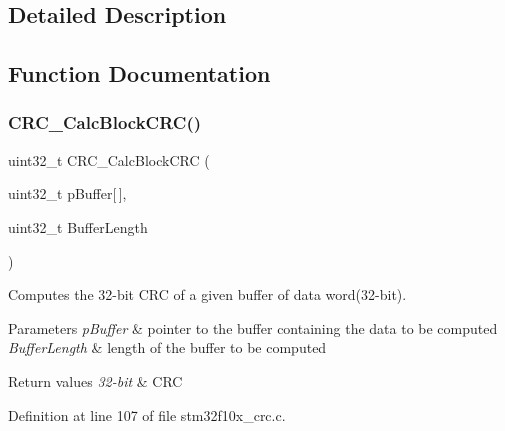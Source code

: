\subsection{Detailed Description}


\subsection{Function Documentation}
\mbox{\label{group___c_r_c___private___functions_gab15ebf620615c360048fb4f45b15fae6}} 
\subsubsection{\texorpdfstring{C\+R\+C\+\_\+\+Calc\+Block\+C\+R\+C()}{CRC\_CalcBlockCRC()}}
{\footnotesize\ttfamily uint32\+\_\+t C\+R\+C\+\_\+\+Calc\+Block\+C\+RC (\begin{DoxyParamCaption}\item[{uint32\+\_\+t}]{p\+Buffer\mbox{[}$\,$\mbox{]},  }\item[{uint32\+\_\+t}]{Buffer\+Length }\end{DoxyParamCaption})}



Computes the 32-\/bit C\+RC of a given buffer of data word(32-\/bit). 


\begin{DoxyParams}{Parameters}
{\em p\+Buffer} & pointer to the buffer containing the data to be computed \\
\hline
{\em Buffer\+Length} & length of the buffer to be computed \\
\hline
\end{DoxyParams}

\begin{DoxyRetVals}{Return values}
{\em 32-\/bit} & C\+RC \\
\hline
\end{DoxyRetVals}


Definition at line 107 of file stm32f10x\+\_\+crc.\+c.

\mbox{\label{group___c_r_c___private___functions_ga5407fdbb8e8c9be6322cc8856ae5db3b}} 
